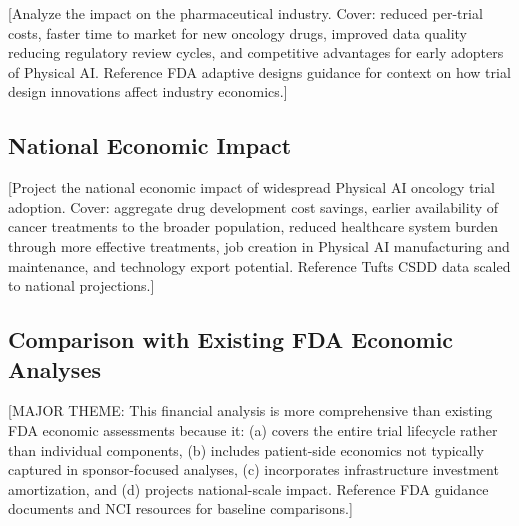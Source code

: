 [Analyze the impact on the pharmaceutical industry. Cover: reduced per-trial
costs, faster time to market for new oncology drugs, improved data quality
reducing regulatory review cycles, and competitive advantages for early
adopters of Physical AI. Reference FDA adaptive designs guidance
\cite{fda-adaptive-designs} for context on how trial design innovations
affect industry economics.]

\subsection{National Economic Impact}
\label{subsec:financial-national}

[Project the national economic impact of widespread Physical AI oncology trial
adoption. Cover: aggregate drug development cost savings, earlier availability
of cancer treatments to the broader population, reduced healthcare system
burden through more effective treatments, job creation in Physical AI
manufacturing and maintenance, and technology export potential. Reference
Tufts CSDD \cite{tufts-delay} data scaled to national projections.]

\subsection{Comparison with Existing FDA Economic Analyses}
\label{subsec:financial-comparison}

[MAJOR THEME: This financial analysis is more comprehensive than existing FDA
economic assessments because it: (a) covers the entire trial lifecycle rather
than individual components, (b) includes patient-side economics not typically
captured in sponsor-focused analyses, (c) incorporates infrastructure
investment amortization, and (d) projects national-scale impact. Reference
FDA guidance documents \cite{fda-clinical-trials-guidance} and NCI resources
\cite{nci-clinical-trials} for baseline comparisons.]
